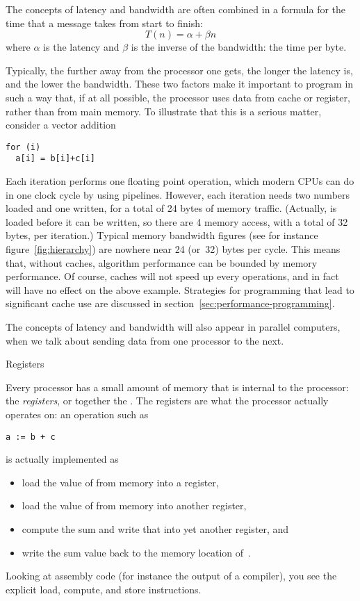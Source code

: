 The concepts of latency and bandwidth are often combined in a formula
for the time that a message takes from start to finish:
\[ T(n) = \alpha+\beta n \]
where $\alpha$ is the latency and $\beta$ is the inverse of the
bandwidth: the time per byte.

Typically, the further away from the processor one gets, the longer
the latency is, and the lower the bandwidth.
These two factors make it important to program in such a
way that, if at all possible, the processor uses data from cache or register,
rather than from main memory. To illustrate that this is a serious
matter, consider a vector addition
\begin{verbatim}
for (i)
  a[i] = b[i]+c[i]
\end{verbatim}
Each iteration performs one floating point operation, which modern
\acp{CPU} can do in one clock cycle by using pipelines. However, each
iteration needs two numbers loaded and one written, for a total of 24
bytes of memory traffic.
(Actually,  is loaded before it can be written,
so there are 4 memory access, with a total of 32 bytes, per
iteration.)
Typical memory bandwidth figures (see
for instance figure~\ref{fig:hierarchy}) are nowhere near 24 (or~32) bytes per
cycle. This means that, without caches, algorithm performance can be
bounded by memory performance. Of course, caches will not speed up
every operations, and in fact will have no effect on the above
example. Strategies for programming that lead to significant cache use
are discussed in section~\ref{sec:performance-programming}.

The concepts of latency and bandwidth will also appear in parallel
computers, when we talk about sending data from one processor to the
next.

 {Registers}
\label{sec:register}

Every processor has a small amount of memory that is internal to the
processor: the \emph{registers}, or together the
. The registers are what the processor
actually operates on: an operation such as 
\begin{verbatim}
a := b + c
\end{verbatim}
is actually implemented as 
\begin{itemize}
\item load the value of  from memory into a register,
\item load the value of  from memory into another register,
\item compute the sum and write that into yet another register, and
\item write the sum value back to the memory location of~.
\end{itemize}
Looking at assembly code (for instance the output of a compiler), you
see the explicit load, compute, and store instructions.

